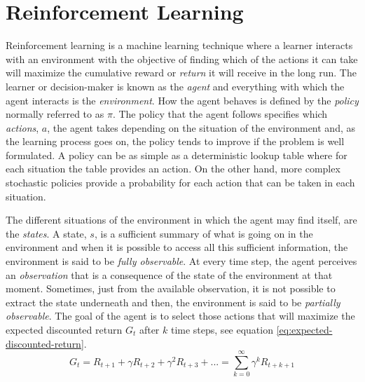 
\section{Reinforcement Learning}
\label{section:Reinforcement-Learning}
Reinforcement learning is a machine learning technique where a learner interacts with an environment with the objective of finding which of the actions it can take will maximize the cumulative reward or \textit{return} it will receive in the long run\cite{Sutton:1998}. The learner or decision-maker is known as the \textit{agent} and everything with which the agent interacts is the \textit{environment}. How the agent behaves is defined by the \textit{policy} normally referred to as $\pi$. The policy that the agent follows specifies which \textit{actions}, $a$, the agent takes depending on the situation of the environment and, as the learning process goes on, the policy tends to improve if the problem is well formulated.  A policy can be as simple as a deterministic lookup table where for each situation the table provides an action. On the other hand, more complex stochastic policies provide a probability for each action that can be taken in each situation.

The different situations of the environment in which the agent may find itself, are the \textit{states}. A state, $s$, is a sufficient summary of what is going on in the environment and when it is possible to access all this sufficient information, the environment is said to be \textit{fully observable}. At every time step, the agent perceives an \textit{observation} that is a consequence of the state of the environment at that moment. Sometimes, just from the available observation, it is not possible to extract the state underneath and then, the environment is said to be \textit{partially observable}. The goal of the agent is to select those actions that will maximize the expected discounted return $G_t$ after $k$ time steps, see equation \ref{eq:expected-discounted-return}.
\begin{equation}
G_t = R_{t+1} + \gamma R_{t+2} + \gamma^2 R_{t+3} +... = \sum_{k=0}^{\infty} \gamma ^k R_{t+k+1}
\label{eq:expected-discounted-return}
\end{equation}

